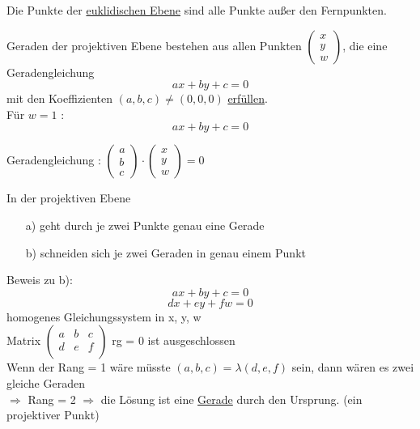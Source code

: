 \documentclass[11pt]{article}
\begin{document}
Die Punkte der \underline{euklidischen Ebene} sind alle Punkte außer den Fernpunkten.

Geraden der projektiven Ebene bestehen aus allen Punkten $\begin{pmatrix}
x \\ y \\ w 
\end{pmatrix}$, die eine Geradengleichung 
$$ ax + by + c = 0 $$
mit den Koeffizienten $(a,b,c) \neq (0,0,0)$ \underline{erfüllen}.\\
Für $w=1$ :
$$ ax + by + c = 0 $$

Geradengleichung : 
$\begin{pmatrix}
a \\ b \\ c
\end{pmatrix}
\cdot 
\begin{pmatrix}
x \\ y \\ w 
\end{pmatrix}
= 0 $

In der projektiven Ebene
\begin{enumerate}
\item[a)] geht durch je zwei Punkte genau eine Gerade
\item[b)] schneiden sich je zwei Geraden in genau einem Punkt
\end{enumerate}

Beweis zu b):
$$ ax + by + c = 0$$
$$ dx + ey + fw = 0$$
homogenes Gleichungssystem in x, y, w \\
Matrix $\begin{pmatrix}
a & b & c \\
d & e & f \\
\end{pmatrix}$ rg = 0 ist ausgeschlossen\\
Wenn der Rang = 1 wäre müsste $(a,b,c) = \lambda(d,e,f)$ sein, dann wären es zwei gleiche Geraden\\
$\Rightarrow $ Rang = 2 $\Rightarrow $ die Lösung ist eine \underline{Gerade} durch den Ursprung. (ein projektiver Punkt)\\
\newline
\end{document}

